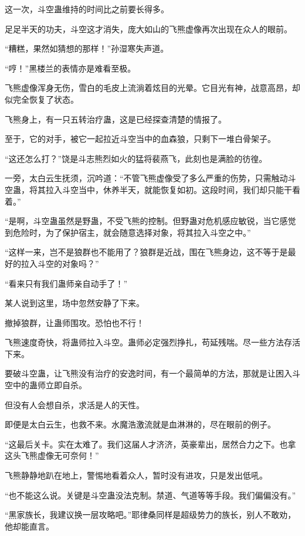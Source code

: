 
\begin{this_body}

这一次，斗空蛊维持的时间比之前要长得多。

足足半天的功夫，斗空这才消失，庞大如山的飞熊虚像再次出现在众人的眼前。

“糟糕，果然如猜想的那样！”孙湿寒失声道。

“哼！”黑楼兰的表情亦是难看至极。

飞熊虚像浑身无伤，雪白的毛皮上流淌着炫目的光晕。它目光有神，战意高昂，却似完全恢复了状态。

飞熊身上，有一只五转治疗蛊，这是已经探查清楚的情报了。

至于，它的对手，被它一起拉近斗空当中的血森狼，只剩下一堆白骨架子。

“这还怎么打？”饶是斗志熊烈如火的猛将裴燕飞，此刻也是满脸的彷徨。

一旁，太白云生抚须，沉吟道：“不管飞熊虚像受了多么严重的伤势，只需触动斗空蛊，将其拉入斗空当中，休养半天，就能恢复如初。这段时间，我们却只能干看着。”

“是啊，斗空蛊虽然是野蛊，不受飞熊的控制。但野蛊对危机感应敏锐，当它感觉到危险时，为了保护宿主，就会随意选择对象，将其拉入斗空之中。”

“这样一来，岂不是狼群也不能用了？狼群是近战，围在飞熊身边，这不等于是最好的拉入斗空的对象吗？”

“看来只有我们蛊师亲自动手了！”

某人说到这里，场中忽然安静了下来。

撤掉狼群，让蛊师围攻。恐怕也不行！

飞熊速度奇快，将蛊师拉入斗空。蛊师必定强烈挣扎，苟延残喘。尽一些方法存活下来。

要破斗空蛊，让飞熊没有治疗的安逸时间，有一个最简单的方法，那就是让困入斗空中的蛊师立即自杀。

但没有人会想自杀，求活是人的天性。

即便是太白云生，也救不来。水魔浩激流就是血淋淋的，尽在眼前的例子。

“这最后关卡。实在太难了。我们这届人才济济，英豪辈出，居然合力之下。也拿这头飞熊虚像无可奈何！”

飞熊静静地趴在地上，警惕地看着众人，暂时没有进攻，只是发出低吼。

“也不能这么说。关键是斗空蛊没法克制。禁道、气道等等手段。我们偏偏没有。”

“黑家族长，我建议换一层攻略吧。”耶律桑同样是超级势力的族长，别人不敢劝，他却能直言。


\end{this_body}
